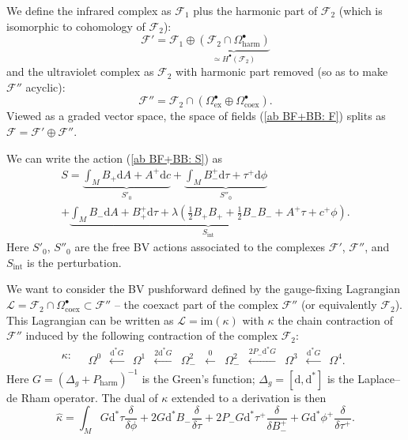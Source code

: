 \documentclass{amsart}
\theoremstyle{plain} %
\theoremstyle{definition}
\theoremstyle{remark}
\newcommand{\mr}{\mathrm}
\newcommand{\bt}{\bullet}
\newcommand{\wh}{\widehat}
\newcommand{\F}{\mathcal{F}}
\newcommand{\LL}{\mathcal{L}}
\newcommand{\ii}{\mathrm{int}}
\newcommand{\xla}{\xleftarrow}
\newcommand{\dr}{\mathrm{d}}
\begin{document}
We define the infrared complex as $\F_1$ plus the harmonic part of $\F_2$ (which is isomorphic to cohomology of $\F_2$):
\begin{equation}
    \F'=\F_1\oplus \underbrace{\left( \F_2\cap \Omega^\bt_\mr{harm}\right)}_{\simeq H^\bt(\F_2)}
\end{equation}
and the ultraviolet complex as $\F_2$ with harmonic part removed (so as to make $\F''$ acyclic):
\begin{equation}
    \F''=\F_2\cap (\Omega^\bt_\mr{ex}\oplus \Omega^\bt_\mr{coex}).
\end{equation}
Viewed as a graded vector space, the space of fields (\ref{ab BF+BB: F}) splits as $\F=\F'\oplus \F''$. 

We can write the action (\ref{ab BF+BB: S}) as
\begin{multline}
    S=\underbrace{\int_M B_+ \dr A + A^+ \dr c}_{S'_0}+\underbrace{\int_M B^+_- \dr \tau+\tau^+\dr \phi}_{S''_0} \\
    + \underbrace{\int_M B_- \dr A+B_+^+ \dr \tau+\lambda \left( \frac12 B_+ B_+ +\frac12 B_-B_- +A^+\tau+c^+\phi\right)}_{S_\ii}.
\end{multline}
Here $S'_0$, $S''_0$ are the free BV actions associated to the complexes $\F'$, $\F''$, and $S_\ii$ is the perturbation.

We want to consider the BV pushforward defined by the gauge-fixing Lagrangian $\LL=\F_2\cap \Omega_\mr{coex}^\bt \subset \F''$ -- the coexact part of the complex $\F''$ (or equivalently $\F_2$). This Lagrangian can be written as $\LL=\mr{im}(\kappa)$ with $\kappa$ the chain contraction of $\F''$ induced by the following contraction of the complex $\F_2$:
\begin{equation}\label{ab BF+BB: kappa}
    \kappa\colon\quad
    \begin{array}{ccccccccccc} 
       \Omega^0 &\xla{\dr^*G} &\Omega^1 &\xla{2\dr^* G}& \Omega^2_- &\xla{0}& \Omega^2_-& \xla{2P_-\dr^* G} &\Omega^3 &\xla{\dr^*G} &\Omega^4.
    \end{array}
\end{equation}
Here $G=(\Delta_g+P_\mr{harm})^{-1}$ is the Green's function; $\Delta_g=[\dr,\dr^*]$ is the Laplace--de Rham operator. The dual of $\kappa$ extended to a derivation is then
\begin{equation}\label{ab BF+BB: kappahat}
    \wh\kappa=\int_M G \dr^*\tau \frac{\delta}{\delta \phi}+2G \dr^*B_- \frac{\delta}{\delta \tau}+ 2P_- G  \dr^*\tau^+ \frac{\delta}{\delta B_-^+}+G\dr^*\phi^+\frac{\delta}{\delta\tau^+}.
\end{equation}
\end{document}
